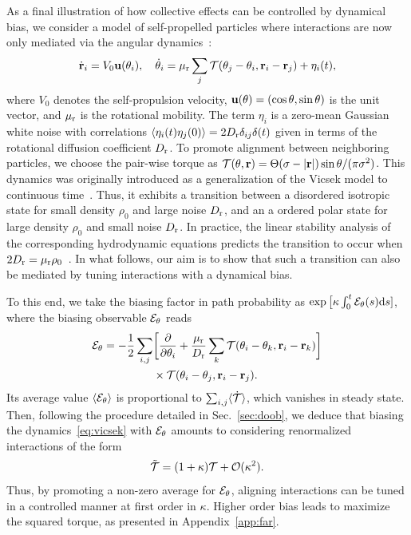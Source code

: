 \documentclass[superscriptaddress, twocolumn, prx, longbibliography, nofootinbib]{revtex4-1}
\providecommand{\DIFaddend}{} %
\begin{document}
\DIFaddend As a final illustration of how collective effects can be controlled by dynamical bias, we consider a model of self-propelled particles where interactions are now only mediated via the angular dynamics~\cite{Farrell2012}:
\begin{equation}\label{eq:vicsek}
	\dot{\bf r}_i= V_0 {\bf u}(\theta_i),
	\quad
	\dot\theta_i = \mu_{\rm r} \sum_j {\cal T}(\theta_j-\theta_i, {\bf r}_i-{\bf r}_j) + \eta_i(t) ,
\end{equation}
where $V_0$ denotes the self-propulsion velocity, ${\bf u}(\theta) = (\cos\theta, \sin\theta)$ is the unit vector, and $\mu_{\rm r}$ is the rotational mobility. The term $\eta_i$ is a zero-mean Gaussian white noise with correlations $\langle\eta_i(t)\eta_j(0)\rangle = 2 D_{\rm r} \delta_{ij}\delta(t)$ given in terms of the rotational diffusion coefficient $D_{\rm r}$. To promote alignment between neighboring particles, we choose the pair-wise torque as ${\cal T}(\theta,{\bf r})=\Theta(\sigma-|{\bf r}|)\sin\theta/(\pi\sigma^2)$. This dynamics was originally introduced as a generalization of the Vicsek model to continuous time~\cite{Vicsek1995}. Thus, it exhibits a transition between a disordered isotropic state for small density $\rho_0$ and large noise $D_{\rm r}$, and an a ordered polar state for large density $\rho_0$ and small noise $D_{\rm r}$. In practice, the linear stability analysis of the corresponding hydrodynamic equations predicts the transition to occur when $2 D_{\rm r}=\mu_{\rm r}\rho_0$~\cite{Farrell2012}. In what follows, our aim is to show that such a transition can also be mediated by tuning interactions with a dynamical bias.


To this end, we take the biasing factor in path probability as $\exp\big[\kappa \int_0^t{\cal E}_\theta(s){\rm d}s]$, where the biasing observable ${\cal E}_\theta$ reads
\begin{equation}
	\begin{aligned}\label{eq:eps_theta}
		{\cal E}_\theta = - \frac{1}{2} \sum_{i,j}& \bigg[ \frac{\partial}{\partial\theta_i} + \frac{\mu_{\rm r}}{D_{\rm r}} \sum_k {\cal T}(\theta_i-\theta_k, {\bf r}_i-{\bf r}_k) \bigg]
		\\
		&\times{\cal T}(\theta_i-\theta_j, {\bf r}_i-{\bf r}_j) .
	\end{aligned}
\end{equation}
Its average value $\langle{\cal E}_\theta\rangle$ is proportional to $\sum_{i,j}\langle\dot {\cal T} \rangle$, which vanishes in steady state. Then, following the procedure detailed in Sec.~\ref{sec:doob}, we deduce that biasing the dynamics~\eqref{eq:vicsek} with ${\cal E}_\theta$ amounts to considering renormalized interactions of the form 
\begin{equation}\label{eq:torque}
	\tilde{\cal T} = (1+\kappa){\cal T} + {\cal O}(\kappa^2) .
\end{equation}
Thus, by promoting a non-zero average for ${\cal E}_\theta$, aligning interactions can be tuned in a controlled manner at first order in $\kappa$. Higher order bias leads to maximize the squared torque, as presented in Appendix~\ref{app:far}.
\end{document}
